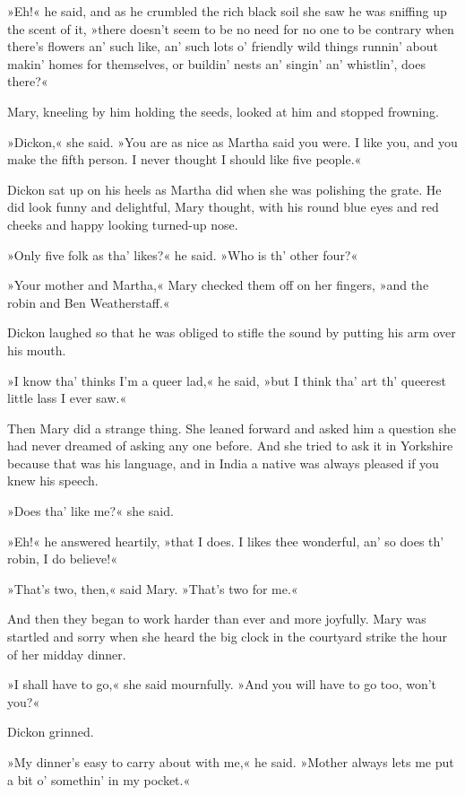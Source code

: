 »Eh!« he said, and as he crumbled the rich black soil she saw he was sniffing up the scent of it, »there doesn't seem to be no need for no one to be contrary when there's flowers an' such like, an' such lots o' friendly wild things runnin' about makin' homes for themselves, or buildin' nests an' singin' an' whistlin', does there?«

Mary, kneeling by him holding the seeds, looked at him and stopped frowning.

»Dickon,« she said. »You are as nice as Martha said you were. I like you, and you make the fifth person. I never thought I should like five people.«

Dickon sat up on his heels as Martha did when she was polishing the grate. He did look funny and delightful, Mary thought, with his round blue eyes and red cheeks and happy looking turned-up nose.

»Only five folk as tha' likes?« he said. »Who is th' other four?«

»Your mother and Martha,« Mary checked them off on her fingers, »and the robin and Ben Weatherstaff.«

Dickon laughed so that he was obliged to stifle the sound by putting his arm over his mouth.

»I know tha' thinks I'm a queer lad,« he said, »but I think tha' art th' queerest little lass I ever saw.«

Then Mary did a strange thing. She leaned forward and asked him a question she had never dreamed of asking any one before. And she tried to ask it in Yorkshire because that was his language, and in India a native was always pleased if you knew his speech.

»Does tha' like me?« she said.

»Eh!« he answered heartily, »that I does. I likes thee wonderful, an' so does th' robin, I do believe!«

»That's two, then,« said Mary. »That's two for me.«

And then they began to work harder than ever and more joyfully. Mary was startled and sorry when she heard the big clock in the courtyard strike the hour of her midday dinner.

»I shall have to go,« she said mournfully. »And you will have to go too, won't you?«

Dickon grinned.

»My dinner's easy to carry about with me,« he said. »Mother always lets me put a bit o' somethin' in my pocket.«

